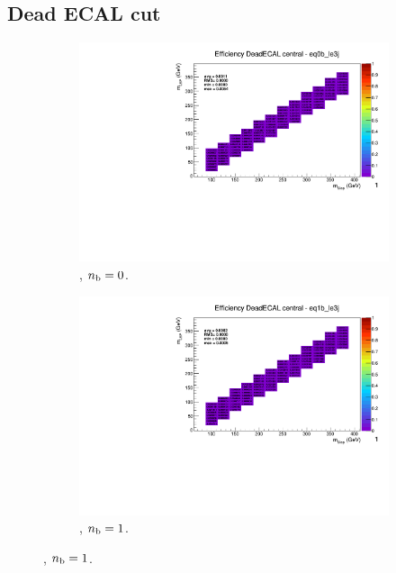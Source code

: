 \newpage
\subsection*{Dead ECAL cut}
\label{sec:t2degen_deadecal_plots}

\begin{figure}[h!]
  \centering
  \begin{subfigure}[b]{0.4\textwidth}
    \includegraphics[width=\textwidth, page=5]{Figs/sms/t2degen/v19/systs/T2_4body_DeadECAL_eq0b_le3j.pdf}
    \caption{\njlow, $n_{\text{b}} = 0$.}
  \end{subfigure}
  \begin{subfigure}[b]{0.4\textwidth}
    \includegraphics[width=\textwidth, page=5]{Figs/sms/t2degen/v19/systs/T2_4body_DeadECAL_eq1b_le3j.pdf}
    \caption{\njlow, $n_{\text{b}} = 1$.}

\end{subfigure}
\end{figure}
